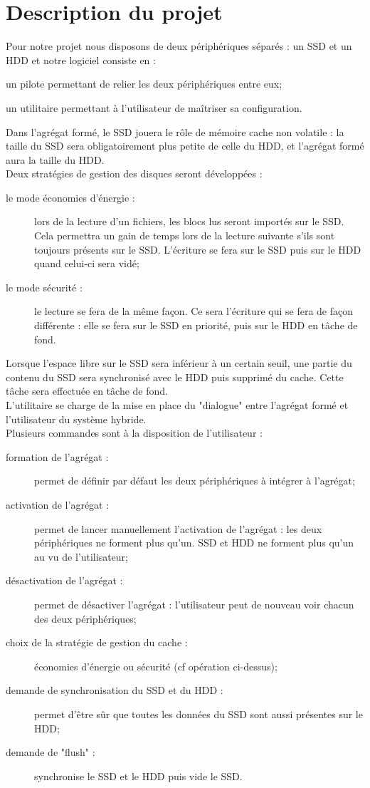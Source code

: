 \documentclass[a4paper,10pt]{article}
\begin{document}
\section{Description du projet}
Pour notre projet nous disposons de deux périphériques séparés : un SSD et un HDD et notre logiciel consiste en : 
\begin{description}
 \item un pilote permettant de relier les deux périphériques entre eux;
 \item un utilitaire permettant à l'utilisateur de maîtriser sa configuration.
\end{description}
Dans l'agrégat formé, le SSD jouera le rôle de mémoire cache non volatile : la taille du SSD sera obligatoirement plus petite de celle du HDD, et 
l'agrégat formé aura la taille du HDD. \\
Deux stratégies de gestion des disques seront développées : 
\begin{description}
 \item [le mode économies d'énergie : ] lors de la lecture d'un fichiers, les blocs lus seront importés sur le SSD. Cela permettra un gain de temps lors 
de la lecture suivante s'ils sont toujours présents sur le SSD. L'écriture se fera sur le SSD puis sur le HDD quand celui-ci sera vidé;
 \item [le mode sécurité :] le lecture se fera de la même façon. Ce sera l'écriture qui se fera de façon différente : elle se fera sur le SSD en 
priorité, puis sur le HDD en tâche de fond.
\end{description}
Lorsque l'espace libre sur le SSD sera inférieur à un certain seuil, une partie du contenu du SSD sera synchronisé avec le HDD puis supprimé du cache.
Cette tâche sera effectuée en tâche de fond.\bigskip\\

L'utilitaire se charge de la mise en place du "dialogue" entre l'agrégat formé et l'utilisateur du système hybride.\bigskip\\
Plusieurs commandes sont à la disposition de l'utilisateur : 
\begin{description}
 \item [formation de l'agrégat :] permet de définir par défaut les deux périphériques à intégrer à l'agrégat;
 \item [activation de l'agrégat :] permet de lancer manuellement l'activation de l'agrégat : les deux périphériques ne forment plus qu'un. SSD et HDD ne 
forment plus qu'un au vu de l'utilisateur;
 \item [désactivation de l'agrégat :] permet de désactiver l'agrégat : l'utilisateur peut de nouveau voir chacun des deux périphériques;
 \item [choix de la stratégie de gestion du cache :] économies d'énergie ou sécurité (cf opération ci-dessus);
 \item [demande de synchronisation du SSD et du HDD :] permet d'être sûr que toutes les données du SSD sont aussi présentes sur le HDD;
 \item [demande de "flush" :] synchronise le SSD et le HDD puis vide le SSD.
\end{description}
\end{document}
